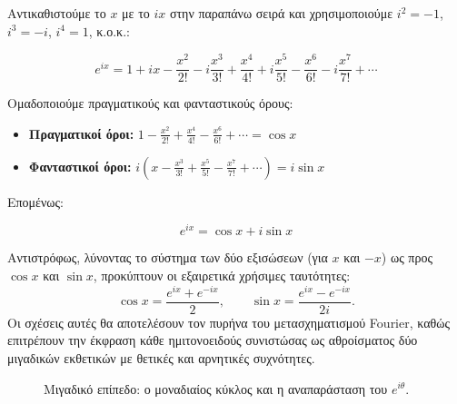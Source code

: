 \documentclass[a4paper, 11pt]{article}
\providecommand{\tightlist}{\setlength{\itemsep}{0pt}\setlength{\parskip}{0pt}}
\begin{document}
Αντικαθιστούμε το \(x\) με το \(ix\) στην παραπάνω σειρά και
χρησιμοποιούμε \(i^2 = -1\), \(i^3 = -i\), \(i^4 = 1\), κ.ο.κ.:

\[
e^{ix} = 1 + ix - \frac{x^2}{2!} - i\frac{x^3}{3!} + \frac{x^4}{4!} + i\frac{x^5}{5!} - \frac{x^6}{6!} - i\frac{x^7}{7!} + \cdots
\]

Ομαδοποιούμε πραγματικούς και φανταστικούς όρους:

\begin{itemize}
\tightlist
\item
  \textbf{Πραγματικοί όροι:}
  \(1 - \frac{x^2}{2!} + \frac{x^4}{4!} - \frac{x^6}{6!} + \cdots = \cos x\)
\item
  \textbf{Φανταστικοί όροι:}
  \(i\left(x - \frac{x^3}{3!} + \frac{x^5}{5!} - \frac{x^7}{7!} + \cdots\right) = i\sin x\)
\end{itemize}

Επομένως:

\[
\boxed{e^{ix} = \cos x + i\sin x}
\]

Αντιστρόφως, λύνοντας το σύστημα των δύο εξισώσεων (για \(x\) και
\(-x\)) ως προς \(\cos x\) και \(\sin x\), προκύπτουν οι εξαιρετικά
χρήσιμες ταυτότητες: \[
\cos x = \frac{e^{ix} + e^{-ix}}{2}, \qquad 
\sin x = \frac{e^{ix} - e^{-ix}}{2i}.
\] Οι σχέσεις αυτές θα αποτελέσουν τον πυρήνα του μετασχηματισμού
Fourier, καθώς επιτρέπουν την έκφραση κάθε ημιτονοειδούς συνιστώσας ως
αθροίσματος δύο μιγαδικών εκθετικών με θετικές και αρνητικές συχνότητες.

\begin{figure}[htbp]
\centering
{}
\caption{Μιγαδικό επίπεδο: ο μοναδιαίος κύκλος και η αναπαράσταση του $e^{i\theta}$.}
\label{fig:euler}
\end{figure}
\end{document}

